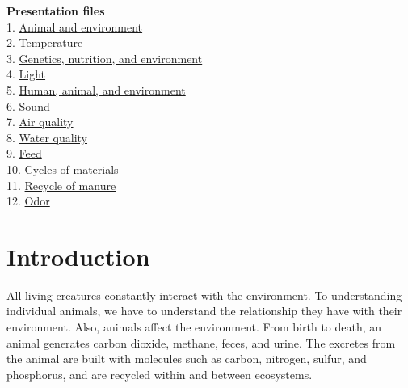 \documentclass[]{book}
\begin{document}
\textbf{Presentation files}\\
1. \href{https://youngjunna.github.io/aes/02-AnimalandEnvironment}{Animal and environment}\\
2. \href{https://youngjunna.github.io/aes/03-Temperature}{Temperature}\\
3. \href{https://github.com/YoungjunNa/2019-animal-nutrition-and-the-environment/raw/master/03\%E1\%84\%8C\%E1\%85\%AE\%E1\%84\%8E\%E1\%85\%A1-\%E1\%84\%83\%E1\%85\%A9\%E1\%86\%BC\%E1\%84\%86\%E1\%85\%AE\%E1\%86\%AF\%E1\%84\%92\%E1\%85\%AA\%E1\%86\%AB\%E1\%84\%80\%E1\%85\%A7\%E1\%86\%BC\%E1\%84\%92\%E1\%85\%A1\%E1\%86\%A8.pdf}{Genetics, nutrition, and environment}\\
4. \href{https://youngjunna.github.io/aes/04-Light}{Light}\\
5. \href{https://github.com/YoungjunNa/aes/raw/master/04-aes.pdf}{Human, animal, and environment}\\
6. \href{https://youngjunna.github.io/aes/05-Sound}{Sound}\\
7. \href{https://youngjunna.github.io/aes/06-AirQuality}{Air quality}\\
8. \href{https://youngjunna.github.io/aes/07-WaterQuality}{Water quality}\\
9. \href{https://youngjunna.github.io/aes/08-ByProducts}{Feed}\\
10. \href{https://youngjunna.github.io/aes/09-CyclesOfMaterials}{Cycles of materials}\\
11. \href{https://drive.google.com/file/d/1zayyDJWH9KQ0vKPsu2tNeH75u-USbIFv/view?usp=sharing}{Recycle of manure}\\
12. \href{https://drive.google.com/open?id=1Hze2tdsbKGxIF02kD9K_9p8RFX9vLFoE}{Odor}

\hypertarget{intro}{%
\chapter{Introduction}\label{intro}}

All living creatures constantly interact with the environment. To understanding individual animals, we have to understand the relationship they have with their environment. Also, animals affect the environment. From birth to death, an animal generates carbon dioxide, methane, feces, and urine. The excretes from the animal are built with molecules such as carbon, nitrogen, sulfur, and phosphorus, and are recycled within and between ecosystems.
\end{document}
